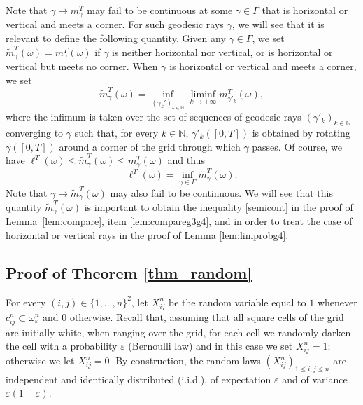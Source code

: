 \documentclass[10pt]{amsart}
\def\N{\mathbb{N}}
\theoremstyle{definition}
\begin{document}
{
Note that $\gamma\mapsto m_\gamma^T$ may fail to be continuous at some $\gamma\in\Gamma$ that is horizontal or vertical and meets a corner. For such geodesic rays $\gamma$, we will see that it is relevant to define the following quantity. Given any $\gamma\in\Gamma$, we set $\widetilde m^T_\gamma(\omega) = m^T_\gamma(\omega)$ if $\gamma$ is neither horizontal nor vertical, or is horizontal or vertical but meets no corner. When $\gamma$ is horizontal or vertical and meets a corner, we set
\begin{equation}\label{def_tildemT}
\widetilde m^T_\gamma(\omega) = \inf_{(\gamma_k')_{k\in \N}}\liminf_{k\to +\infty} m^T_{\gamma'_k}(\omega),
\end{equation}
where the infimum is taken over the set of sequences of geodesic rays $(\gamma'_k)_{k\in\N}$ converging to $\gamma$ such that, for every $k\in\N$, $\gamma'_k([0,T])$ is obtained by rotating $\gamma([0,T])$ around a corner of the grid through which $\gamma$ passes.
Of course, we have $\ell^T(\omega) \leq \widetilde m^T_\gamma(\omega) \leq m^T_\gamma(\omega)$ and thus
\begin{equation*}
\ell^T(\omega) = \inf_{\gamma \in \Gamma} \widetilde m^T_\gamma(\omega).
\end{equation*}
Note that $\gamma\mapsto \widetilde m^T_\gamma(\omega)$ may also fail to be continuous.
We will see that this quantity $\widetilde m^T_\gamma(\omega)$ is important to obtain the inequality \eqref{semicont} in the proof of Lemma~\ref{lem:compare}, item \eqref{lem:compareg3g4}, and in order to treat the case of horizontal or vertical rays in the proof of Lemma \ref{lem:limprobg4}.
}

\subsection{Proof of Theorem \ref{thm_random}}\label{sec:sketch}
For every $(i,j)\in \{1,\ldots,n\}^2$, let $X_{ij}^n$ be the random variable equal to $1$ whenever $c_{ij}^n\subset\omega_\varepsilon^n$ and $0$ otherwise.
Recall that, assuming that all square cells of the grid are initially white, when ranging over the grid, for each cell we randomly darken the cell with a probability $\varepsilon$ (Bernoulli law) and in this case we set $X_{ij}^n=1$; otherwise we let $X_{ij}^n=0$.
By construction, the random laws $(X_{ij}^n)_{1\leq i,j\leq n}$ are independent and identically distributed (i.i.d.), of expectation $\varepsilon$ and of variance $\varepsilon(1-\varepsilon)$.
\end{document}
